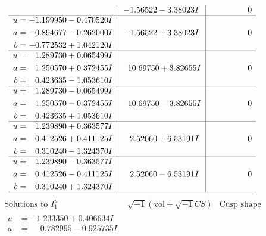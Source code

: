 \documentclass[1p]{elsarticle_modified}
\theoremstyle{definition}
\newcommand{\I}{\sqrt{-1}}
\begin{document}
$$\begin{array}{c|c|c}
 & -1.56522 - 3.38023 I & \phantom{-0.000000 } 0 \\ \hline\begin{aligned}
u &= -1.199950 - 0.470520 I \\
a &= -0.894677 - 0.262000 I \\
b &= -0.772532 + 1.042120 I\end{aligned}
 & -1.56522 + 3.38023 I & \phantom{-0.000000 } 0 \\ \hline\begin{aligned}
u &= \phantom{-}1.289730 + 0.065499 I \\
a &= \phantom{-}1.250570 + 0.372455 I \\
b &= \phantom{-}0.423635 - 1.053610 I\end{aligned}
 & \phantom{-}10.69750 + 3.82655 I & \phantom{-0.000000 } 0 \\ \hline\begin{aligned}
u &= \phantom{-}1.289730 - 0.065499 I \\
a &= \phantom{-}1.250570 - 0.372455 I \\
b &= \phantom{-}0.423635 + 1.053610 I\end{aligned}
 & \phantom{-}10.69750 - 3.82655 I & \phantom{-0.000000 } 0 \\ \hline\begin{aligned}
u &= \phantom{-}1.239890 + 0.363577 I \\
a &= \phantom{-}0.412526 + 0.411125 I \\
b &= \phantom{-}0.310240 - 1.324370 I\end{aligned}
 & \phantom{-}2.52060 + 6.53191 I & \phantom{-0.000000 } 0 \\ \hline\begin{aligned}
u &= \phantom{-}1.239890 - 0.363577 I \\
a &= \phantom{-}0.412526 - 0.411125 I \\
b &= \phantom{-}0.310240 + 1.324370 I\end{aligned}
 & \phantom{-}2.52060 - 6.53191 I & \phantom{-0.000000 } 0\\
 \hline 
 \end{array}$$\newpage$$\begin{array}{c|c|c}  
\text{Solutions to }I^u_{1}& \I (\text{vol} + \sqrt{-1}CS) & \text{Cusp shape}\\
 \hline 
\begin{aligned}
u &= -1.233350 + 0.406634 I \\
a &= \phantom{-}0.782995 - 0.925735 I \\

\end{aligned}
\end{array}$$
\end{document}
